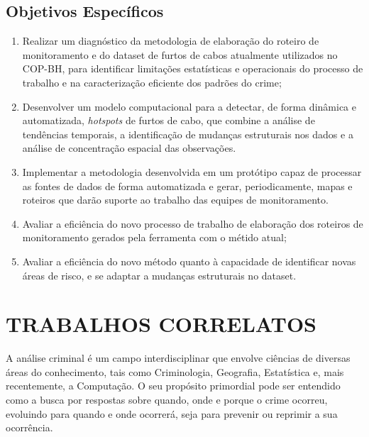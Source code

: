 \subsection{Objetivos Específicos}
\label{subsec:objespc}
\begin{enumerate}
  \item{Realizar um diagnóstico da metodologia de elaboração do roteiro de monitoramento e do dataset de furtos de cabos atualmente utilizados no COP-BH, para identificar limitações estatísticas e operacionais do processo de trabalho e na caracterização eficiente dos padrões do crime;}
  \item{Desenvolver um modelo computacional para a detectar, de forma dinâmica e automatizada, \textit{hotspots} de furtos de cabo, que combine a análise de tendências temporais, a identificação de mudanças estruturais nos dados e a análise de concentração espacial das observações.}
  \item{Implementar a metodologia desenvolvida em um protótipo capaz de processar as fontes de dados de forma automatizada e gerar, periodicamente, mapas e roteiros que darão suporte ao trabalho das equipes de monitoramento.}
  \item{Avaliar a eficiência do novo processo de trabalho de elaboração dos roteiros de monitoramento gerados pela ferramenta com o métido atual;}
  \item{Avaliar a eficiência do novo método quanto à capacidade de identificar novas áreas de risco, e se adaptar a mudanças estruturais no dataset.}
\end{enumerate}

\section{TRABALHOS CORRELATOS}
\label{sec:estadoarte}
A análise criminal é um campo interdisciplinar que envolve ciências de diversas áreas do conhecimento, tais como Criminologia, Geografia, Estatística e, mais recentemente, a Computação. O seu propósito primordial pode ser entendido como a busca por respostas sobre quando, onde e porque o crime ocorreu, evoluindo para quando e onde ocorrerá, seja para prevenir ou reprimir a sua ocorrência.

